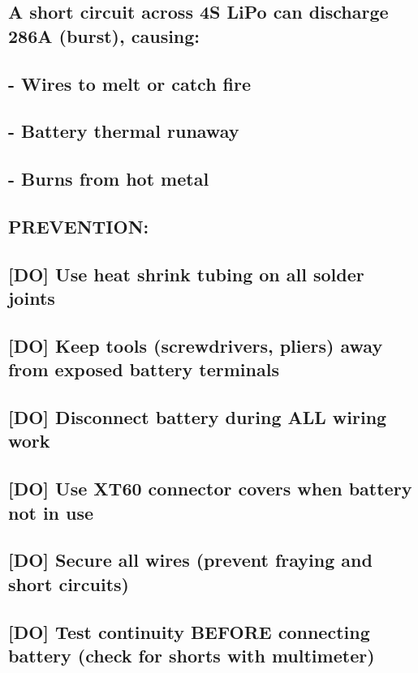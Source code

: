 \documentclass[11pt,letterpaper]{article}
\begin{document}
{{\subsection*{A short circuit across 4S LiPo can discharge 286A (burst), causing:}

\subsection*{- Wires to melt or catch fire}

\subsection*{- Battery thermal runaway}

\subsection*{- Burns from hot metal}

\subsection*{PREVENTION:}

\subsection*{[DO] Use heat shrink tubing on all solder joints}

\subsection*{[DO] Keep tools (screwdrivers, pliers) away from exposed battery terminals}

\subsection*{[DO] Disconnect battery during ALL wiring work}

\subsection*{[DO] Use XT60 connector covers when battery not in use}

\subsection*{[DO] Secure all wires (prevent fraying and short circuits)}

\subsection*{[DO] Test continuity BEFORE connecting battery (check for shorts with multimeter)}

}}
\end{document}
